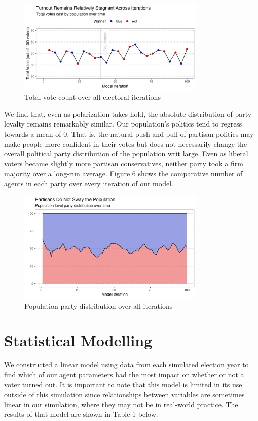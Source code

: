 \documentclass[titlepage, 12pt, leqno]{article} %
\begin{document}
\begin{figure}[ht]
    \centering
    \includegraphics[width=0.8\textwidth]{../plots/total_votes.png}
    \caption{Total vote count over all electoral iterations}
\end{figure}

We find that, even as polarization takes hold, the absolute distribution of 
party loyalty remains remarkably similar. Our population's politics tend to
regress towards a mean of 0. That is, the natural push and pull of partisan
politics may make people more confident in their votes but does not necessarily
change the overall political party distribution of the population writ large.
Even as liberal voters became slightly more partisan conservatives, neither 
party took a firm majority over a long-run average. Figure 6 shows the
comparative number of agents in each party over every iteration of our model.
\pagebreak

\begin{figure}[ht]
    \centering
    \includegraphics[width=0.8\textwidth]{../plots/party_dist.png}
    \caption{Population party distribution over all iterations}
\end{figure}

\section{Statistical Modelling}
We constructed a linear model using data from each simulated election year to
find which of our agent parameters had the most impact on whether or not a
voter turned out. It is important to note that this model is limited in its use
outside of this simulation since relationships between variables are sometimes
linear in our simulation, where they may not be in real-world practice. The
results of that model are shown in Table 1 below.
\end{document}
